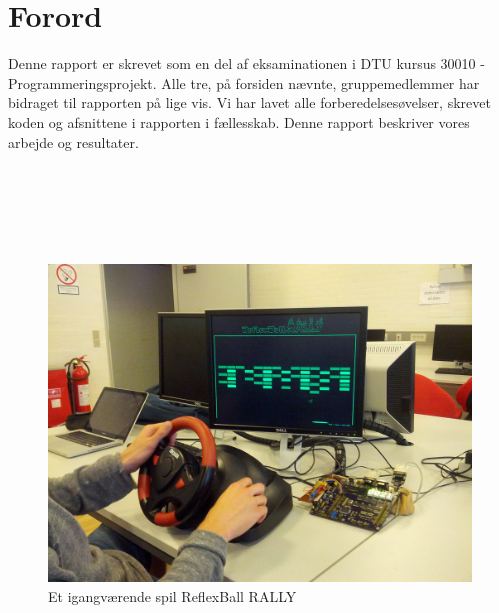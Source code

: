 \chapter{Forord}

Denne rapport er skrevet som en del af eksaminationen i DTU kursus 30010 - Programmeringsprojekt. Alle tre, på forsiden nævnte, gruppemedlemmer har bidraget til rapporten på lige vis. Vi har lavet alle forberedelsesøvelser, skrevet koden og afsnittene i rapporten i fællesskab. Denne rapport beskriver vores arbejde og resultater.\\ \\ \\ \\ \\ \\

\begin{figure}[h!]
\centering
\includegraphics[scale=0.17]{figs/forside.jpg}
\caption{Et igangværende spil ReflexBall RALLY}
\label{fig:forside}
\end{figure}